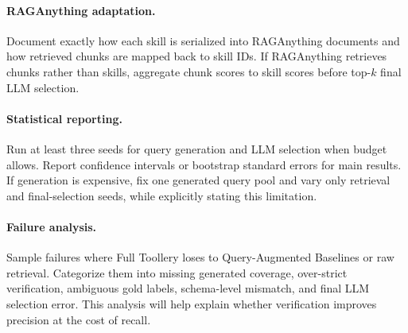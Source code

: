 \paragraph{RAGAnything adaptation.}
Document exactly how each skill is serialized into RAGAnything documents and how
retrieved chunks are mapped back to skill IDs. If RAGAnything retrieves chunks
rather than skills, aggregate chunk scores to skill scores before top-$k$ final
LLM selection.

\paragraph{Statistical reporting.}
Run at least three seeds for query generation and LLM selection when budget
allows. Report confidence intervals or bootstrap standard errors for main
results. If generation is expensive, fix one generated query pool and vary only
retrieval and final-selection seeds, while explicitly stating this limitation.

\paragraph{Failure analysis.}
Sample failures where Full Toollery loses to Query-Augmented Baselines or raw
retrieval. Categorize them into missing generated coverage, over-strict
verification, ambiguous gold labels, schema-level mismatch, and final LLM
selection error. This analysis will help explain whether verification improves
precision at the cost of recall.
